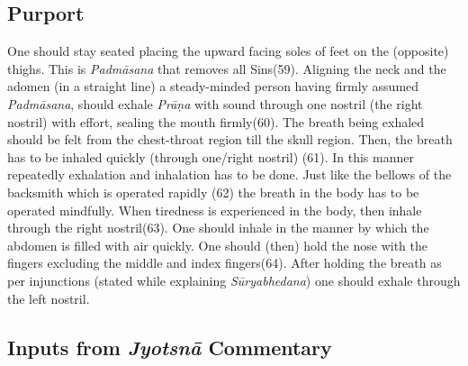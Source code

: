 \subsection*{Purport}


One should stay seated placing the upward facing soles of feet on the (opposite) thighs. This is \textit{Padmāsana} that removes all Sins(59). Aligning the neck and the adomen (in a straight line) a steady-minded person having firmly assumed \textit{Padmāsana}, should exhale \textit{Prāṇa} with sound through one nostril (the right nostril) with effort, sealing the mouth firmly(60). The breath being exhaled should be felt from the chest-throat region till the skull region. Then, the breath has to be inhaled quickly (through one/right nostril) (61). In this manner repeatedly exhalation and inhalation has to be done. Just like the bellows of the backsmith which is operated rapidly (62) the breath in the body has to be operated mindfully. When tiredness is experienced in the body, then inhale through the right nostril(63). One should inhale in the manner by which the abdomen is filled with air quickly. One should (then) hold the nose with the fingers excluding the middle and index fingers(64). After holding the breath as per injunctions (stated while explaining \textit{Sūryabhedana}) one should exhale through the left nostril.

\subsection*{Inputs from \textit{Jyotsnā} Commentary}


